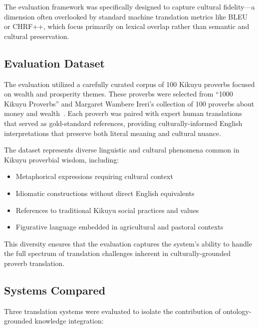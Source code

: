 The evaluation framework was specifically designed to capture cultural fidelity---a dimension often overlooked by standard machine translation metrics like BLEU or CHRF++, which focus primarily on lexical overlap rather than semantic and cultural preservation.

\subsection{Evaluation Dataset}

The evaluation utilized a carefully curated corpus of 100 Kikuyu proverbs focused on wealth and prosperity themes. These proverbs were selected from ``1000 Kikuyu Proverbs'' and Margaret Wambere Ireri's collection of 100 proverbs about money and wealth~\cite{ireri2019proverbs}. Each proverb was paired with expert human translations that served as gold-standard references, providing culturally-informed English interpretations that preserve both literal meaning and cultural nuance.

The dataset represents diverse linguistic and cultural phenomena common in Kikuyu proverbial wisdom, including:
\begin{itemize}
    \item Metaphorical expressions requiring cultural context
    \item Idiomatic constructions without direct English equivalents
    \item References to traditional Kikuyu social practices and values
    \item Figurative language embedded in agricultural and pastoral contexts
\end{itemize}

This diversity ensures that the evaluation captures the system's ability to handle the full spectrum of translation challenges inherent in culturally-grounded proverb translation.

\subsection{Systems Compared}

Three translation systems were evaluated to isolate the contribution of ontology-grounded knowledge integration:

